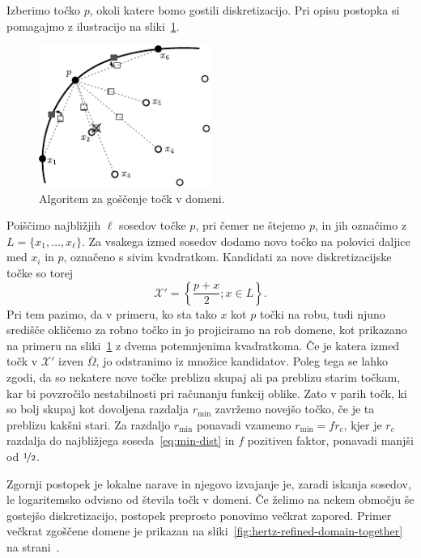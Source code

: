 \documentclass[12pt,a4paper,twoside]{article}
\theoremstyle{definition} %
\theoremstyle{plain} %
\numberwithin{equation}{section}
\newcommand{\X}{\mathcal{X}}
\newcommand{\zomega}{\overline{\Omega}}
\begin{document}
Izberimo točko $p$, okoli katere bomo gostili diskretizacijo. Pri opisu postopka si pomagajmo z
ilustracijo na sliki~\ref{fig:refine-algorithm}.
\begin{figure}[h]
  \centering
  \includegraphics[width=0.5\textwidth]{images/domain_refine.pdf}
  \caption{Algoritem za goščenje točk v domeni.}
  \label{fig:refine-algorithm}
\end{figure}
Poiščimo najbližjih $\ell$ sosedov točke $p$, pri čemer ne štejemo $p$, in jih označimo z $L = \{x_1,
\dots, x_\ell\}$. Za vsakega izmed sosedov dodamo novo točko na polovici daljice med $x_i$ in $p$,
označeno s sivim kvadratkom. Kandidati za nove diskretizacijske točke so torej
\begin{equation}
   \X' = \left\{ \frac{p+x}{2}; x \in L \right\}.
\end{equation}
Pri tem pazimo, da v primeru, ko sta tako $x$ kot $p$ točki na robu, tudi njuno središče okličemo
za robno točko in jo projiciramo na rob domene, kot prikazano na primeru na
sliki~\ref{fig:refine-algorithm} z dvema potemnjenima kvadratkoma. Če je katera izmed točk v $\X'$
izven $\zomega$, jo odstranimo iz množice kandidatov. Poleg tega se lahko zgodi, da so nekatere nove
točke preblizu skupaj ali pa preblizu starim točkam, kar bi povzročilo nestabilnosti pri računanju
funkcij oblike. Zato v parih točk, ki so bolj skupaj kot dovoljena razdalja $r_{\text{min}}$
zavržemo novejšo točko, če je ta preblizu kakšni stari. Za razdaljo $r_\text{min}$ ponavadi vzamemo
$r_\text{min} = f r_c$, kjer je $r_c$ razdalja do najbližjega soseda~\eqref{eq:min-dist} in $f$
pozitiven faktor, ponavadi manjši od $\nicefrac{1}{2}$.

Zgornji postopek je lokalne narave in njegovo izvajanje je, zaradi iskanja sosedov, le logaritemsko
odvisno od števila točk v domeni. Če želimo na nekem območju še gostejšo diskretizacijo, postopek
preprosto ponovimo večkrat zapored. Primer večkrat zgoščene domene je prikazan na
sliki~\ref{fig:hertz-refined-domain-together} na strani~\pageref{fig:hertz-refined-domain-together}.
\end{document}
